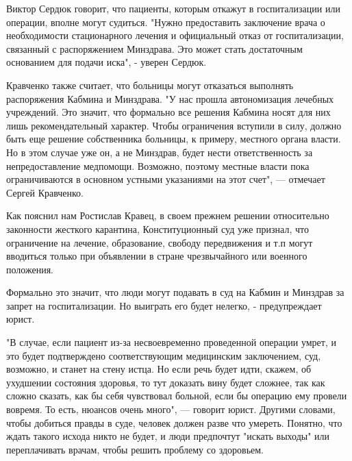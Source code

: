 Виктор Сердюк говорит, что пациенты, которым откажут в госпитализации или
операции, вполне могут судиться. "Нужно предоставить заключение врача о
необходимости стационарного лечения и официальный отказ от госпитализации,
связанный с распоряжением Минздрава. Это может стать достаточным основанием для
подачи иска", - уверен Сердюк.

Кравченко также считает, что больницы могут отказаться выполнять распоряжения
Кабмина и Минздрава. "У нас прошла автономизация лечебных учреждений. Это
значит, что формально все решения Кабмина носят для них лишь рекомендательный
характер. Чтобы ограничения вступили в силу, должно быть еще решение
собственника больницы, к примеру, местного органа власти. Но в этом случае уже
он, а не Минздрав, будет нести ответственность за непредоставление медпомощи.
Возможно, поэтому местные власти пока ограничиваются в основном устными
указаниями на этот счет", — отмечает Сергей Кравченко.

Как пояснил нам Ростислав Кравец, в своем прежнем решении относительно
законности жесткого карантина, Конституционный суд уже признал, что ограничение
на лечение, образование, свободу передвижения и т.п могут вводиться только при
объявлении в стране чрезвычайного или военного положения.

Формально это значит, что люди могут подавать в суд на Кабмин и Минздрав за
запрет на госпитализации. Но выиграть его будет нелегко, - предупреждает юрист.

"В случае, если пациент из-за несвоевременно проведенной операции умрет, и это
будет подтверждено соответствующим медицинским заключением, суд, возможно, и
станет на стену истца. Но если речь будет идти, скажем, об ухудшении состояния
здоровья, то тут доказать вину будет сложнее, так как сложно сказать, как бы
себя чувствовал больной, если бы операцию ему провели вовремя. То есть, нюансов
очень много", — говорит юрист. Другими словами, чтобы добиться правды в суде,
человек должен разве что умереть. Понятно, что ждать такого исхода никто не
будет, и люди предпочтут "искать выходы" или переплачивать врачам, чтобы решить
проблему со здоровьем.

